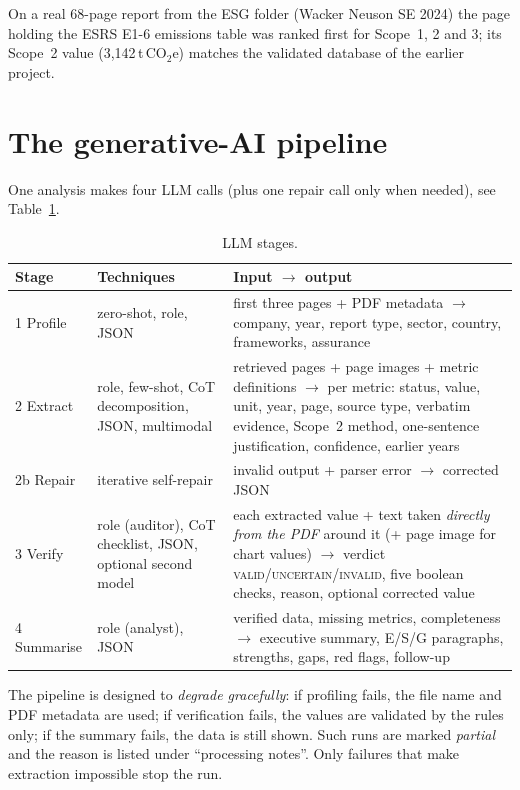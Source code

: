 \documentclass[11pt,a4paper]{article}
\begin{document}
On a real 68-page report from the ESG folder (Wacker Neuson SE 2024) the page holding the ESRS E1-6
emissions table was ranked first for Scope~1, 2 and 3; its Scope~2 value (3{,}142\,t\,CO$_2$e) matches the
validated database of the earlier project.

\section{The generative-AI pipeline}\label{sec:pipeline}
One analysis makes four LLM calls (plus one repair call only when needed), see Table~\ref{tab:calls}.

\begin{table}[H]
\centering\small
\begin{tabularx}{\linewidth}{@{}l>{\raggedright\arraybackslash}p{3.2cm}X@{}}
\toprule
\textbf{Stage} & \textbf{Techniques} & \textbf{Input $\rightarrow$ output}\\\midrule
1 Profile & zero-shot, role, JSON & first three pages + PDF metadata $\rightarrow$ company, year, report type, sector, country, frameworks, assurance\\
2 Extract & role, few-shot, CoT decomposition, JSON, multimodal & retrieved pages + page images + metric definitions $\rightarrow$ per metric: status, value, unit, year, page, source type, verbatim evidence, Scope~2 method, one-sentence justification, confidence, earlier years\\
2b Repair & iterative self-repair & invalid output + parser error $\rightarrow$ corrected JSON\\
3 Verify & role (auditor), CoT checklist, JSON, optional second model & each extracted value + text taken \emph{directly from the PDF} around it (+ page image for chart values) $\rightarrow$ verdict \textsc{valid}/\textsc{uncertain}/\textsc{invalid}, five boolean checks, reason, optional corrected value\\
4 Summarise & role (analyst), JSON & verified data, missing metrics, completeness $\rightarrow$ executive summary, E/S/G paragraphs, strengths, gaps, red flags, follow-up\\
\bottomrule
\end{tabularx}
\caption{LLM stages.}
\label{tab:calls}
\end{table}

The pipeline is designed to \emph{degrade gracefully}: if profiling fails, the file name and PDF metadata
are used; if verification fails, the values are validated by the rules only; if the summary fails, the
data is still shown. Such runs are marked \emph{partial} and the reason is listed under ``processing
notes''. Only failures that make extraction impossible stop the run.
\end{document}
